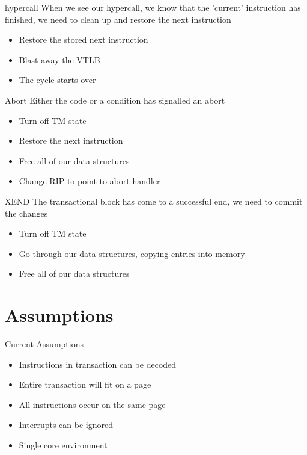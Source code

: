 \documentclass{beamer}
\begin{document}
\begin{frame}{hypercall}
  When we see our hypercall, we know that the 'current' instruction has finished,
  we need to clean up and restore the next instruction

  \begin{itemize}
    \item Restore the stored next instruction
    \item Blast away the VTLB
    \item The cycle starts over
  \end{itemize}
\end{frame}

\begin{frame}{Abort}
  Either the code or a condition has signalled an abort

  \begin{itemize}
    \item Turn off TM state
    \item Restore the next instruction
    \item Free all of our data structures
    \item Change RIP to point to abort handler
  \end{itemize}
\end{frame}

\begin{frame}{XEND}
  The transactional block has come to a successful end, we need to commit the
  changes

  \begin{itemize}
    \item Turn off TM state
    \item Go through our data structures, copying entries into memory
    \item Free all of our data structures
  \end{itemize}
\end{frame}

\section{Assumptions}
\begin{frame}{Current Assumptions}
  \begin{itemize}
    \item Instructions in transaction can be decoded
    \item Entire transaction will fit on a page
    \item All instructions occur on the same page
    \item Interrupts can be ignored
    \item Single core environment
  \end{itemize}
\end{frame}
\end{document}
